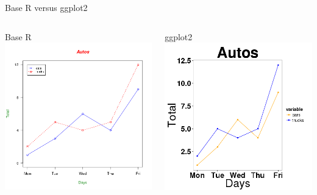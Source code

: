 \documentclass[t,10pt]{beamer}
\begin{document}
\begin{frame}[label={sec:orgheadline15}]{Base R versus ggplot2}
\begin{columns}
\begin{column}{0.5\columnwidth}
\begin{block}{Base R}
\includegraphics[width=.9\linewidth]{./Base.png}
\end{block}
\end{column}

\begin{column}{0.5\columnwidth}
\begin{block}{ggplot2}
\includegraphics[width=.9\linewidth]{./Ahh_Better_ggplot2_example.png}   
\end{block}
\end{column}
\end{columns}
\end{frame}
\end{document}
